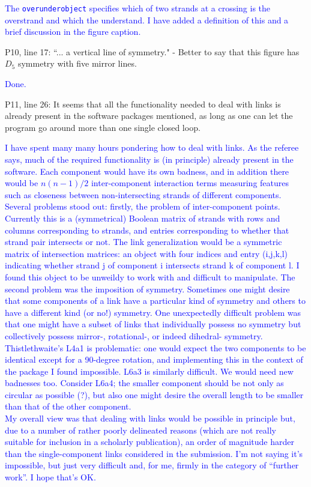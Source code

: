 \documentclass[12pt]{article}
\begin{document}
\textcolor{blue}{The {\tt overunderobject} specifies which of two
  strands at a crossing is the overstrand and which the understand.  I
  have added a definition of this and a brief discussion in the figure
  caption.}


P10, line 17: ``... a vertical line of symmetry." - Better to say that
this figure has $D_5$ symmetry with five mirror lines.


\textcolor{blue}{Done.}

P11, line 26: It seems that all the functionality needed to deal with
links is already present in the software packages mentioned, as long
as one can let the program go around more than one single closed loop.

\textcolor{blue}{I have spent many many hours pondering how to deal
  with links.  As the referee says, much of the required functionality
  is (in principle) already present in the software.  Each component
  would have its own badness, and in addition there would be
  $n(n-1)/2$ inter-component interaction terms measuring features such
  as closeness between non-intersecting strands of different
  components.  Several problems stood out: firstly, the problem of
  inter-component points.  Currently this is a (symmetrical) Boolean
  matrix of strands with rows and columns corresponding to strands,
  and entries corresponding to whether that strand pair intersects or
  not.  The link generalization would be a symmetric matrix of
  intersection matrices: an object with four indices and entry
  (i,j,k,l) indicating whether strand j of component i intersects
  strand k of component l.  I found this object to be unweildy to work
  with and difficult to manipulate.  The second problem was the
  imposition of symmetry.  Sometimes one might desire that some
  components of a link have a particular kind of symmetry and others
  to have a different kind (or no!) symmetry.  One unexpectedly
  difficult problem was that one might have a subset of links that
  individually possess no symmetry but collectively possess mirror-,
  rotational-, or indeed dihedral- symmetry.  Thistlethwaite's L4a1 is
  problematic: one would expect the two components to be identical
  except for a 90-degree rotation, and implementing this in the
  context of the package I found impossible. L6a3 is similarly
  difficult.  We would need new badnesses too.  Consider L6a4; the
  smaller component should be not only as circular as possible (?),
  but also one might desire the overall length to be smaller than that
  of the other component.\\ My overall view was that dealing with
  links would be possible in principle but, due to a number of rather
  poorly delineated reasons (which are not really suitable for
  inclusion in a scholarly publication), an order of magnitude harder
  than the single-component links considered in the submission.  I'm
  not saying it's impossible, but just very difficult and, for me,
  firmly in the category of ``further work''.  I hope that's OK.}
\end{document}
